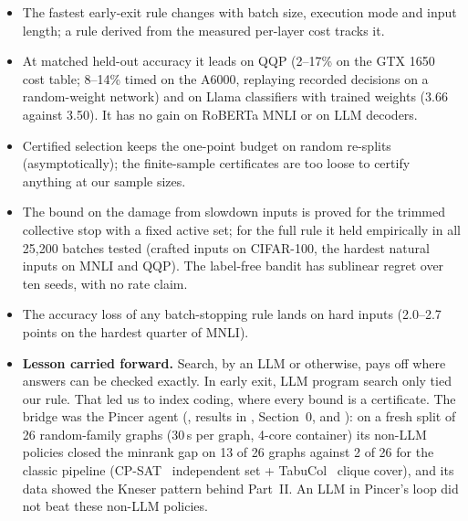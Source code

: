 \begin{itemize}
  \item The fastest early-exit rule changes with batch size, execution mode and input length; a rule derived from the
  measured per-layer cost tracks it.
  \item At matched held-out accuracy it leads on QQP (2--17\% on the GTX 1650 cost table; 8--14\% timed on the A6000,
  replaying recorded decisions on a random-weight network) and on Llama classifiers with trained weights (3.66\x{}
  against 3.50\x). It has no gain on RoBERTa MNLI or on LLM decoders.
  \item Certified selection keeps the one-point budget on random re-splits (asymptotically); the finite-sample
  certificates are too loose to certify anything at our sample sizes.
  \item The bound on the damage from slowdown inputs is proved for the trimmed collective stop with a fixed active
  set; for the full rule it held empirically in all 25{,}200 batches tested (crafted inputs on CIFAR-100, the hardest
  natural inputs on MNLI and QQP). The label-free bandit has sublinear regret over ten seeds, with no rate claim.
  \item The accuracy loss of any batch-stopping rule lands on hard inputs (2.0--2.7 points on the hardest quarter of
  MNLI).
  \item \textbf{Lesson carried forward.} Search, by an LLM or otherwise, pays off where answers can be checked
  exactly. In early exit, LLM program search only tied our rule. That led us to index coding, where every bound is a
  certificate. The bridge was the Pincer agent (, results in , Section~0, and
  ): on a fresh split of 26 random-family graphs (30\,s per graph, 4-core
  container) its non-LLM policies closed the minrank gap on 13 of 26 graphs against 2 of 26 for the classic pipeline
  (CP-SAT~\cite{cpsat} independent set + TabuCol~\cite{tabucol} clique cover), and its data showed the Kneser pattern
  behind Part~II. An LLM in Pincer's loop did not beat these non-LLM policies.
\end{itemize}
